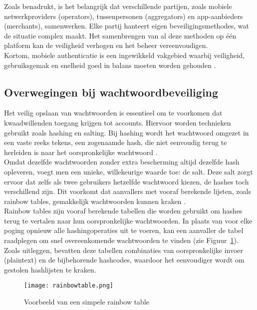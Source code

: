 Zoals \textcite{Zukarnain2022} benadrukt, is het belangrijk dat verschillende partijen, zoals mobiele netwerkproviders (operators), tussenpersonen (aggregators) en app-aanbieders (merchants), samenwerken. Elke partij hanteert eigen beveiligingsmethodes, wat de situatie complex maakt. Het samenbrengen van al deze methoden op één platform kan de veiligheid verhogen en het beheer vereenvoudigen.\\

Kortom, mobiele authenticatie is een ingewikkeld vakgebied waarbij veiligheid, gebruiksgemak en snelheid goed in balans moeten worden gehouden \autocite{Zukarnain2022, Balaj2017}.\\


\subsection{Overwegingen bij wachtwoordbeveiliging}
Het veilig opslaan van wachtwoorden is essentieel om te voorkomen dat kwaadwillenden toegang krijgen tot accounts. Hiervoor worden technieken gebruikt zoals hashing en salting. Bij hashing wordt het wachtwoord omgezet in een vaste reeks tekens, een zogenaamde hash, die niet eenvoudig terug te herleiden is naar het oorspronkelijke wachtwoord \autocite{Sriramya2015}.\\

Omdat dezelfde wachtwoorden zonder extra bescherming altijd dezelfde hash opleveren, voegt men een unieke, willekeurige waarde toe: de salt. Deze salt zorgt ervoor dat zelfs als twee gebruikers hetzelfde wachtwoord kiezen, de hashes toch verschillend zijn. Dit voorkomt dat aanvallers met vooraf berekende lijsten, zoals rainbow tables, gemakkelijk wachtwoorden kunnen kraken \autocite{Sriramya2015}.\\

Rainbow tables zijn vooraf berekende tabellen die worden gebruikt om hashes terug te vertalen naar hun oorspronkelijke wachtwoorden. In plaats van voor elke poging opnieuw alle hashingoperaties uit te voeren, kan een aanvaller de tabel raadplegen om snel overeenkomende wachtwoorden te vinden (zie Figuur~\ref{fig:rainbowtable}). Zoals \textcite{ViniciusFulberGarcia2024} uitleggen, bevatten deze tabellen combinaties van oorspronkelijke invoer (plaintext) en de bijbehorende hashcodes, waardoor het eenvoudiger wordt om gestolen hashlijsten te kraken.\\

\begin{figure}[h]
	\centering
	\texttt{[image: rainbowtable.png]}
	\caption{Voorbeeld van een simpele rainbow table \autocite{ViniciusFulberGarcia2024}}
	\label{fig:rainbowtable}
\end{figure}


